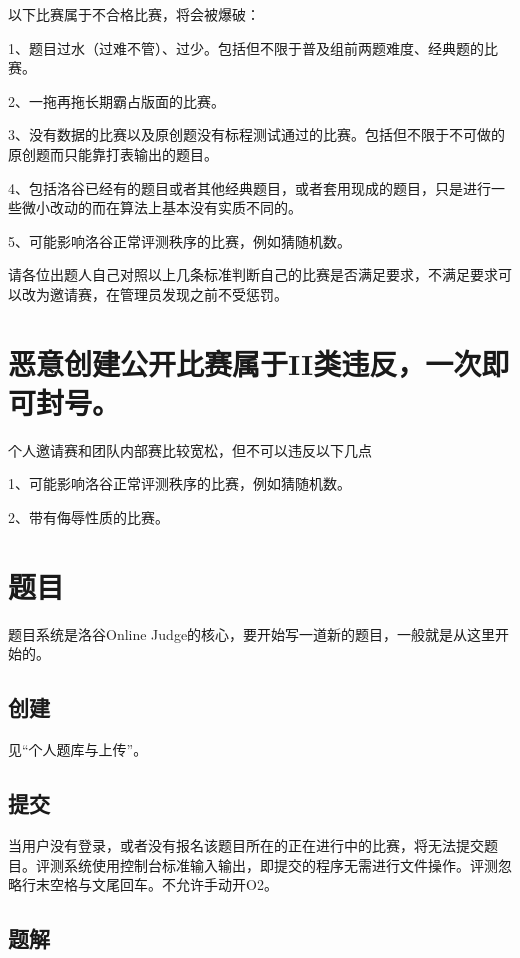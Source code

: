 \documentclass[10pt,a4paper]{article}
\begin{document}
		
		以下比赛属于不合格比赛，将会被爆破：
		
		
		1、题目过水（过难不管）、过少。包括但不限于普及组前两题难度、经典题的比赛。
		
		
		2、一拖再拖长期霸占版面的比赛。
		
		
		3、没有数据的比赛以及原创题没有标程测试通过的比赛。包括但不限于不可做的原创题而只能靠打表输出的题目。
		
		
		4、包括洛谷已经有的题目或者其他经典题目，或者套用现成的题目，只是进行一些微小改动的而在算法上基本没有实质不同的。
		
		
		5、可能影响洛谷正常评测秩序的比赛，例如猜随机数。
		
		
		请各位出题人自己对照以上几条标准判断自己的比赛是否满足要求，不满足要求可以改为邀请赛，在管理员发现之前不受惩罚。
		
		\section{
			恶意创建公开比赛属于II类违反，一次即可封号。}
		
		
		个人邀请赛和团队内部赛比较宽松，但不可以违反以下几点
		
		
		1、可能影响洛谷正常评测秩序的比赛，例如猜随机数。
		
		
		2、带有侮辱性质的比赛。
		
		\section{
			题目}
		
		
		题目系统是洛谷Online Judge的核心，要开始写一道新的题目，一般就是从这里开始的。
		
		\subsection{
			创建}
		
		
		见“个人题库与上传”。
		
		\subsection{
			提交}
		
		
		当用户没有登录，或者没有报名该题目所在的正在进行中的比赛，将无法提交题目。评测系统使用控制台标准输入输出，即提交的程序无需进行文件操作。评测忽略行末空格与文尾回车。不允许手动开O2。
		
		\subsection{
			题解}
		
\end{document}
